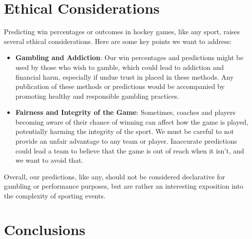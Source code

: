 \documentclass[11pt]{article}
\begin{document}
\section{Ethical Considerations}
Predicting win percentages or outcomes in hockey games, like any sport, raises several ethical considerations. Here are some key points we want to address:

\begin{itemize}[label=\textbullet]
\item \textbf{Gambling and Addiction}:
Our win percentages and predictions might be used by those who wish to gamble, which could lead to addiction and financial harm, especially if undue trust in placed in these methods. Any publication of these methods or predictions would be accompanied by promoting healthy and responsible gambling practices.
    
\item \textbf{Fairness and Integrity of the Game}:
Sometimes, coaches and players becoming aware of their chance of winning can affect how the game is played, potentially harming the integrity of the sport. We must be careful to not provide an unfair advantage to any team or player.
Inaccurate predictions could lead a team to believe that the game is out of reach when it isn't, and we want to avoid that.
            
\end{itemize}

Overall, our predictions, like any, should not be considered declarative for gambling or performance purposes, but are rather an interesting exposition into the complexity of sporting events.


\section{Conclusions}


\end{document}
